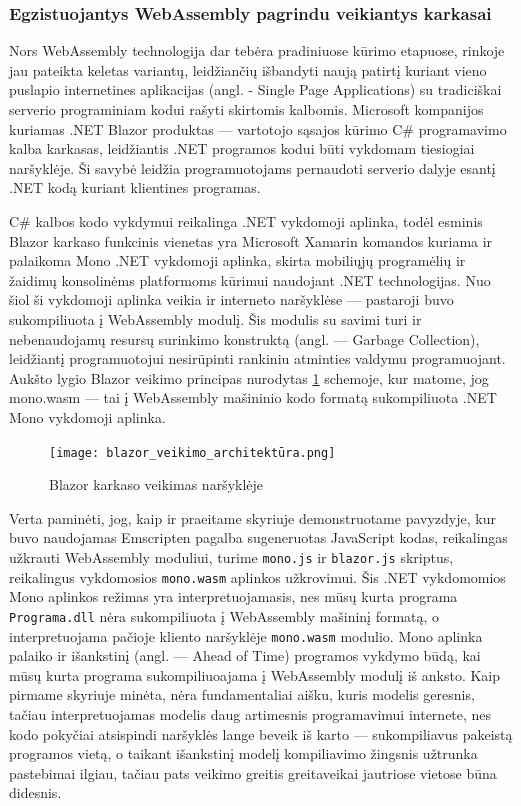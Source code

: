\documentclass{VUMIFPSkursinis}
\begin{document}
\subsubsection{Egzistuojantys WebAssembly pagrindu veikiantys karkasai}
Nors WebAssembly technologija dar tebėra pradiniuose kūrimo etapuose, rinkoje jau pateikta keletas variantų, leidžiančių išbandyti naują patirtį kuriant vieno puslapio internetines aplikacijas (angl. - Single Page Applications) su tradiciškai serverio programiniam kodui rašyti skirtomis kalbomis.
Microsoft kompanijos kuriamas .NET Blazor produktas — vartotojo sąsajos kūrimo C\# programavimo kalba karkasas, leidžiantis .NET programos kodui būti vykdomam tiesiogiai naršyklėje. \cite{BLZ19} Ši savybė leidžia programuotojams pernaudoti serverio dalyje esantį .NET kodą kuriant klientines programas.

C\# kalbos kodo vykdymui reikalinga .NET vykdomoji aplinka, todėl esminis Blazor karkaso funkcinis vienetas yra Microsoft Xamarin komandos kuriama ir palaikoma Mono .NET vykdomoji aplinka, skirta mobiliųjų programėlių ir žaidimų konsolinėms platformoms kūrimui naudojant .NET technologijas. Nuo šiol ši vykdomoji aplinka veikia ir interneto naršyklėse — pastaroji buvo sukompiliuota į WebAssembly modulį. Šis modulis su savimi turi ir nebenaudojamų resursų surinkimo konstruktą (angl. — Garbage Collection), leidžiantį programuotojui nesirūpinti rankiniu atminties valdymu programuojant. Aukšto lygio Blazor veikimo principas nurodytas \ref{fig:blazor_architecture} schemoje, kur matome, jog mono.wasm — tai į WebAssembly mašininio kodo formatą sukompiliuota .NET Mono vykdomoji aplinka.

\begin{figure}[h!]
  \begin{center}
  \texttt{[image: blazor\_veikimo\_architektūra.png]}
  \end{center}
  \caption{Blazor karkaso veikimas naršyklėje \cite{BLZ19}}
  \label{fig:blazor_architecture}
\end{figure}

Verta paminėti, jog, kaip ir praeitame skyriuje demonstruotame pavyzdyje, kur buvo naudojamas Emscripten pagalba sugeneruotas JavaScript kodas, reikalingas užkrauti WebAssembly moduliui, turime \verb|mono.js| ir \verb|blazor.js| skriptus, reikalingus vykdomosios \verb|mono.wasm| aplinkos užkrovimui. Šis .NET vykdomomios Mono aplinkos režimas yra interpretuojamasis, nes mūsų kurta programa \verb|Programa.dll| nėra sukompiliuota į WebAssembly mašininį formatą, o interpretuojama pačioje kliento naršyklėje \verb|mono.wasm| modulio. Mono aplinka palaiko ir išankstinį (angl. — Ahead of Time) programos vykdymo būdą, kai mūsų kurta programa sukompiliuoajama į WebAssembly modulį iš anksto. Kaip pirmame skyriuje minėta, nėra fundamentaliai aišku, kuris modelis geresnis, tačiau interpretuojamas modelis daug artimesnis programavimui internete, nes kodo pokyčiai atsispindi naršyklės lange beveik iš karto — sukompiliavus pakeistą programos vietą, o taikant išankstinį modelį kompiliavimo žingsnis užtrunka pastebimai ilgiau, tačiau pats veikimo greitis greitaveikai jautriose vietose būna didesnis.
\end{document}
